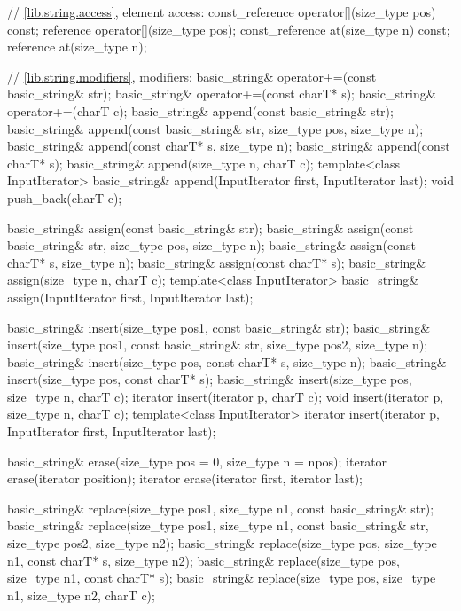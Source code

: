 \begin{codeblock}
{{    // \ref{lib.string.access}, element access:
    const_reference operator[](size_type pos) const;
    reference       operator[](size_type pos);
    const_reference at(size_type n) const;
    reference       at(size_type n);

    // \ref{lib.string.modifiers}, modifiers:
    basic_string& operator+=(const basic_string& str);
    basic_string& operator+=(const charT* s);
    basic_string& operator+=(charT c);
    basic_string& append(const basic_string& str);
    basic_string& append(const basic_string& str, size_type pos,
                         size_type n);
    basic_string& append(const charT* s, size_type n);
    basic_string& append(const charT* s);
    basic_string& append(size_type n, charT c);
    template<class InputIterator>
      basic_string& append(InputIterator first, InputIterator last);
    void push_back(charT c);

    basic_string& assign(const basic_string& str);
    basic_string& assign(const basic_string& str, size_type pos,
                         size_type n);
    basic_string& assign(const charT* s, size_type n);
    basic_string& assign(const charT* s);
    basic_string& assign(size_type n, charT c);
    template<class InputIterator>
      basic_string& assign(InputIterator first, InputIterator last);

    basic_string& insert(size_type pos1, const basic_string& str);
    basic_string& insert(size_type pos1, const basic_string& str,
                         size_type pos2, size_type n);
    basic_string& insert(size_type pos, const charT* s, size_type n);
    basic_string& insert(size_type pos, const charT* s);
    basic_string& insert(size_type pos, size_type n, charT c);
    iterator insert(iterator p, charT c);
    void     insert(iterator p, size_type n, charT c);
    template<class InputIterator>
      iterator insert(iterator p, InputIterator first, InputIterator last);

    basic_string& erase(size_type pos = 0, size_type n = npos);
    iterator erase(iterator position);
    iterator erase(iterator first, iterator last);

    basic_string& replace(size_type pos1, size_type n1,
                          const basic_string& str);
    basic_string& replace(size_type pos1, size_type n1,
                          const basic_string& str,
                          size_type pos2, size_type n2);
    basic_string& replace(size_type pos, size_type n1, const charT* s,
                          size_type n2);
    basic_string& replace(size_type pos, size_type n1, const charT* s);
    basic_string& replace(size_type pos, size_type n1, size_type n2,
                          charT c);

}}
\end{codeblock}
